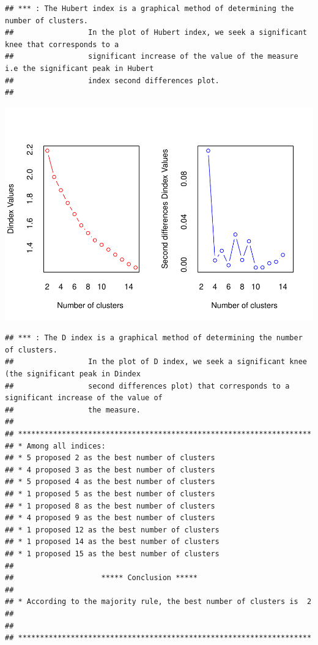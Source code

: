 \documentclass[
]{article}
\begin{document}
\begin{verbatim}
## *** : The Hubert index is a graphical method of determining the number of clusters.
##                 In the plot of Hubert index, we seek a significant knee that corresponds to a 
##                 significant increase of the value of the measure i.e the significant peak in Hubert
##                 index second differences plot. 
## 
\end{verbatim}

\includegraphics{Projet_files/figure-latex/unnamed-chunk-18-2.pdf}

\begin{verbatim}
## *** : The D index is a graphical method of determining the number of clusters. 
##                 In the plot of D index, we seek a significant knee (the significant peak in Dindex
##                 second differences plot) that corresponds to a significant increase of the value of
##                 the measure. 
##  
## ******************************************************************* 
## * Among all indices:                                                
## * 5 proposed 2 as the best number of clusters 
## * 4 proposed 3 as the best number of clusters 
## * 5 proposed 4 as the best number of clusters 
## * 1 proposed 5 as the best number of clusters 
## * 1 proposed 8 as the best number of clusters 
## * 4 proposed 9 as the best number of clusters 
## * 1 proposed 12 as the best number of clusters 
## * 1 proposed 14 as the best number of clusters 
## * 1 proposed 15 as the best number of clusters 
## 
##                    ***** Conclusion *****                            
##  
## * According to the majority rule, the best number of clusters is  2 
##  
##  
## *******************************************************************
\end{verbatim}
\end{document}

